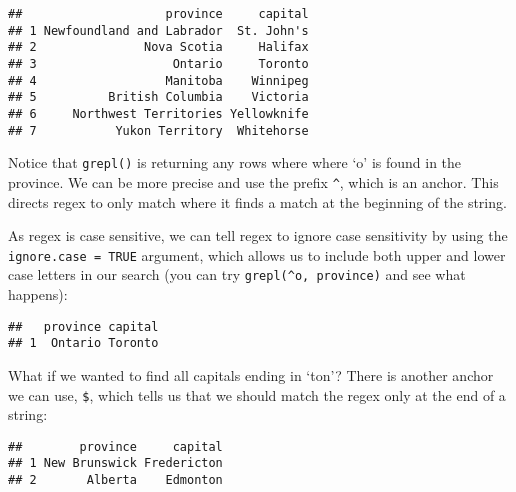 \documentclass[
]{book}
\newenvironment{Shaded}{\begin{snugshade}}{\end{snugshade}}
\newcommand{\DataTypeTok}[1]{\textcolor[rgb]{0.13,0.29,0.53}{#1}}
\newcommand{\KeywordTok}[1]{\textcolor[rgb]{0.13,0.29,0.53}{\textbf{#1}}}
\newcommand{\NormalTok}[1]{#1}
\newcommand{\OperatorTok}[1]{\textcolor[rgb]{0.81,0.36,0.00}{\textbf{#1}}}
\newcommand{\OtherTok}[1]{\textcolor[rgb]{0.56,0.35,0.01}{#1}}
\newcommand{\StringTok}[1]{\textcolor[rgb]{0.31,0.60,0.02}{#1}}
\begin{document}
\begin{verbatim}
##                    province     capital
## 1 Newfoundland and Labrador  St. John's
## 2               Nova Scotia     Halifax
## 3                   Ontario     Toronto
## 4                  Manitoba    Winnipeg
## 5          British Columbia    Victoria
## 6     Northwest Territories Yellowknife
## 7           Yukon Territory  Whitehorse
\end{verbatim}

Notice that \texttt{grepl()} is returning any rows where where `o' is found in the province. We can be more precise and use the prefix \texttt{\^{}}, which is an anchor. This directs regex to only match where it finds a match at the beginning of the string.

As regex is case sensitive, we can tell regex to ignore case sensitivity by using the \texttt{ignore.case\ =\ TRUE} argument, which allows us to include both upper and lower case letters in our search (you can try \texttt{grepl(\textquotesingle{}\^{}o\textquotesingle{},\ province)} and see what happens):

\begin{Shaded}
\end{Shaded}

\begin{verbatim}
##   province capital
## 1  Ontario Toronto
\end{verbatim}

What if we wanted to find all capitals ending in `ton'? There is another anchor we can use, \texttt{\$}, which tells us that we should match the regex only at the end of a string:

\begin{Shaded}
\end{Shaded}

\begin{verbatim}
##        province     capital
## 1 New Brunswick Fredericton
## 2       Alberta    Edmonton
\end{verbatim}
\end{document}
